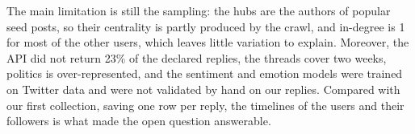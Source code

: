 \documentclass[sigchi]{acmart}
\begin{document}
The main limitation is still the sampling: the hubs are the authors of popular seed posts, so their centrality is partly produced by the crawl, and in-degree is 1 for most of the other users, which leaves little variation to explain. Moreover, the API did not return 23\% of the declared replies, the threads cover two weeks, politics is over-represented, and the sentiment and emotion models were trained on Twitter data and were not validated by hand on our replies. Compared with our first collection, saving one row per reply, the timelines of the users and their followers is what made the open question answerable.



\end{document}
